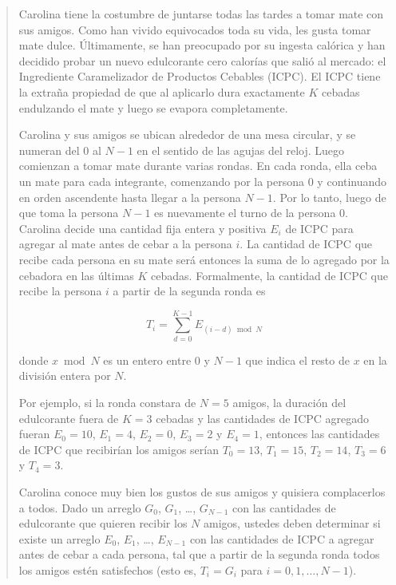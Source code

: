  \begin{quotation}
  Carolina tiene la costumbre de juntarse todas las tardes a tomar mate con sus amigos.  Como han vivido equivocados toda su vida, les gusta tomar mate dulce. Últimamente, se han preocupado por su ingesta calórica y han decidido probar un nuevo edulcorante cero calorías que salió al mercado: el Ingrediente Caramelizador de Productos Cebables (ICPC). El ICPC tiene la extraña propiedad de que al aplicarlo dura exactamente $K$ cebadas endulzando el mate y luego se evapora completamente.

 Carolina y sus amigos se ubican alrededor de una mesa circular, y se numeran del $0$ al $N - 1$ en el sentido de las agujas del reloj. Luego comienzan a tomar mate durante varias rondas. En cada ronda, ella ceba un mate para cada integrante, comenzando por la persona $0$ y continuando en orden ascendente hasta llegar a la persona $N - 1$. Por lo tanto, luego de que toma la persona $N - 1$ es nuevamente el turno de la persona 0. Carolina decide una cantidad fija entera y positiva $E_i$ de ICPC para agregar al mate antes de cebar a la persona $i$. La cantidad de ICPC que recibe cada persona en su mate será entonces la suma de lo agregado por la cebadora en las últimas $K$ cebadas. Formalmente, la cantidad de ICPC que recibe la persona $i$ a partir de la segunda ronda es
 
 
$$
  T_i = \sum_{d=0}^{K-1}E_{(i-d) \bmod N}
$$
 
 
 donde $x \bmod N$ es un entero entre $0$ y $N - 1$ que indica el resto de $x$ en la división entera por $N$.

 Por ejemplo, si la ronda constara de $N = 5$ amigos, la duración del edulcorante fuera de $K = 3$ cebadas y las cantidades de ICPC agregado fueran $E_0 = 10$, $E_1 = 4$, $E_2 = 0$, $E_3 = 2$ y $E_4 = 1$, entonces las cantidades de ICPC que recibirían los amigos serían $T_0 = 13$, $T_1 = 15$, $T_2 = 14$, $T_3 = 6$ y $T_4 = 3$.

 Carolina conoce muy bien los gustos de sus amigos y quisiera complacerlos a todos. Dado un arreglo $G_0$, $G_1$, \ldots, $G_{N-1}$ con las cantidades de edulcorante que quieren recibir los $N$ amigos, ustedes deben determinar si existe un arreglo $E_0$, $E_1$, \ldots, $E_{N-1}$ con las cantidades de ICPC a agregar antes de cebar a cada persona, tal que a partir de la segunda ronda todos los amigos estén satisfechos (esto es, $T_i = G_i$ para $i = 0, 1, \ldots, N - 1$).
 \end{quotation}
